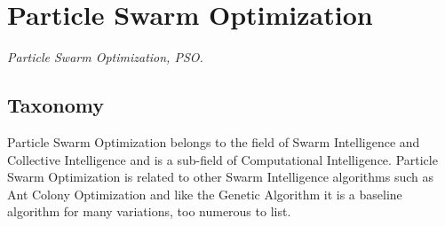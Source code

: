 

\section{Particle Swarm Optimization} 
\label{sec:pso}

\emph{Particle Swarm Optimization, PSO.}

\subsection{Taxonomy}
Particle Swarm Optimization belongs to the field of Swarm Intelligence and Collective Intelligence and is a sub-field of Computational Intelligence.
Particle Swarm Optimization is related to other Swarm Intelligence algorithms such as Ant Colony Optimization and like the Genetic Algorithm it is a baseline algorithm for many variations, too numerous to list.

